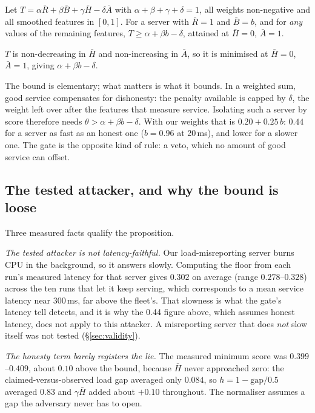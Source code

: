 \documentclass[10pt,twocolumn,letterpaper]{article}
\newcommand{\Tscore}{T}
\newcommand{\Agate}{\bar{A}}
\begin{document}
\begin{proposition}
\label{prop:floor}
Let $\Tscore = \alpha\bar{R} + \beta\bar{B} + \gamma\bar{H} - \delta\Agate$ with
$\alpha+\beta+\gamma+\delta = 1$, all weights non-negative and all smoothed
features in $[0,1]$. For a server with $\bar{R}=1$ and $\bar{B}=b$, and
for \emph{any} values of the remaining features,
$\Tscore \ge \alpha + \beta b - \delta$, attained at $\bar{H}=0$, $\Agate=1$.
\end{proposition}

\begin{proofsketch}
$\Tscore$ is non-decreasing in $\bar{H}$ and non-increasing in $\Agate$, so it
is minimised at $\bar{H}=0$, $\Agate=1$, giving $\alpha + \beta b - \delta$.
\end{proofsketch}

The bound is elementary; what matters is what it bounds. In a weighted sum, good
service compensates for dishonesty: the penalty available is capped by $\delta$,
the weight left over after the features that measure service. Isolating such a
server by score therefore needs $\theta > \alpha + \beta b - \delta$. With our
weights that is $0.20 + 0.25\,b$: $0.44$ for a server as fast as an honest one
($b = 0.96$ at 20\,ms), and lower for a slower one. The gate is the opposite kind
of rule: a veto, which no amount of good service can offset.

\subsection{The tested attacker, and why the bound is loose}
\label{sec:analysis:conservative}
Three measured facts qualify the proposition.

\emph{The tested attacker is not latency-faithful.} Our load-misreporting
server burns CPU in the background, so it answers slowly. Computing the floor
from each run's measured latency for that server gives $0.302$ on average
(range $0.278$--$0.328$) across the ten runs that let it keep serving, which
corresponds to a mean service latency near 300\,ms, far above the fleet's. That
slowness is what the gate's latency tell detects, and it is why the 0.44
figure above, which assumes honest latency, does not apply to this attacker. A
misreporting server that does \emph{not} slow itself was not tested
(\S\ref{sec:validity}).

\emph{The honesty term barely registers the lie.} The measured minimum score was
$0.399$--$0.409$, about $0.10$ above the bound, because $\bar H$ never approached
zero: the claimed-versus-observed load gap averaged only $0.084$, so
$h = 1 - \text{gap}/0.5$ averaged $0.83$ and $\gamma\bar H$ added about $+0.10$
throughout. The normaliser assumes a gap the adversary never has to open.
\end{document}
